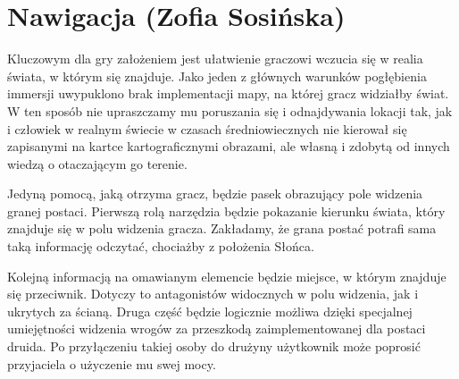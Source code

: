 \section{Nawigacja (Zofia Sosińska)}\label{chap:naw}

Kluczowym dla gry założeniem jest ułatwienie graczowi wczucia się w realia świata, w którym się znajduje. 
Jako jeden z głównych warunków pogłębienia immersji uwypuklono brak implementacji mapy, na której gracz widziałby świat. 
W ten sposób nie upraszczamy mu poruszania się i odnajdywania lokacji tak,
jak i człowiek w realnym świecie w czasach średniowiecznych nie kierował się zapisanymi na kartce kartograficznymi obrazami, 
ale własną i zdobytą od innych wiedzą o otaczającym go terenie. 

Jedyną pomocą, jaką otrzyma gracz, będzie pasek obrazujący pole widzenia granej postaci.
Pierwszą rolą narzędzia będzie pokazanie kierunku świata, który znajduje się w polu widzenia gracza.
Zakładamy, że grana postać potrafi sama taką informację odczytać, chociażby z położenia Słońca.

Kolejną informacją na omawianym elemencie będzie miejsce, w którym znajduje się przeciwnik. 
Dotyczy to antagonistów widocznych w polu widzenia, jak i ukrytych za ścianą. 
Druga część będzie logicznie możliwa dzięki specjalnej umiejętności widzenia wrogów za przeszkodą zaimplementowanej dla postaci druida. 
Po przyłączeniu takiej osoby do drużyny użytkownik może poprosić przyjaciela o użyczenie mu swej mocy.

